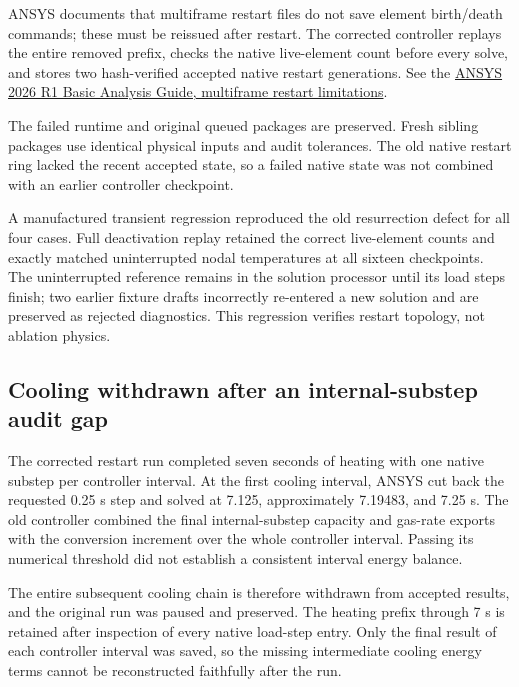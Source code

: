 \documentclass[oneside,openany]{amsdtx}
\begin{document}
ANSYS documents that multiframe restart files do not save element birth/death commands; these must be reissued after restart. The corrected controller replays the entire removed prefix, checks the native live-element count before every solve, and stores two hash-verified accepted native restart generations. See the \href{https://ansyshelp.ansys.com/public/Views/Secured/corp/v261/en/ans_bas/Hlp_G_BAS3_12.html}{ANSYS 2026 R1 Basic Analysis Guide, multiframe restart limitations}.

The failed runtime and original queued packages are preserved. Fresh sibling packages use identical physical inputs and audit tolerances. The old native restart ring lacked the recent accepted state, so a failed native state was not combined with an earlier controller checkpoint.

A manufactured transient regression reproduced the old resurrection defect for all four cases. Full deactivation replay retained the correct live-element counts and exactly matched uninterrupted nodal temperatures at all sixteen checkpoints. The uninterrupted reference remains in the solution processor until its load steps finish; two earlier fixture drafts incorrectly re-entered a new solution and are preserved as rejected diagnostics. This regression verifies restart topology, not ablation physics.

\subsection{Cooling withdrawn after an internal-substep audit gap}

The corrected restart run completed seven seconds of heating with one native substep per controller interval. At the first cooling interval, ANSYS cut back the requested 0.25 s step and solved at 7.125, approximately 7.19483, and 7.25 s. The old controller combined the final internal-substep capacity and gas-rate exports with the conversion increment over the whole controller interval. Passing its numerical threshold did not establish a consistent interval energy balance.

The entire subsequent cooling chain is therefore withdrawn from accepted results, and the original run was paused and preserved. The heating prefix through 7 s is retained after inspection of every native load-step entry. Only the final result of each controller interval was saved, so the missing intermediate cooling energy terms cannot be reconstructed faithfully after the run.
\end{document}
